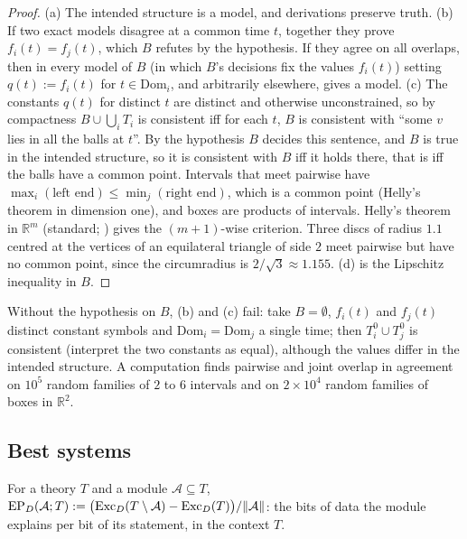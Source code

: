 \begin{proof}
(a) The intended structure is a model, and derivations preserve truth. (b) If two exact models disagree at a common time $t$, together they prove $f_i(t)=f_j(t)$, which $B$ refutes by the hypothesis. If they agree on all overlaps, then in every model of $B$ (in which $B$'s decisions fix the values $f_i(t)$) setting $q(t):=f_i(t)$ for $t\in\mathrm{Dom}_i$, and arbitrarily elsewhere, gives a model. (c) The constants $q(t)$ for distinct $t$ are distinct and otherwise unconstrained, so by compactness $B\cup\bigcup_iT_i$ is consistent iff for each $t$, $B$ is consistent with ``some $v$ lies in all the balls at $t$''. By the hypothesis $B$ decides this sentence, and $B$ is true in the intended structure, so it is consistent with $B$ iff it holds there, that is iff the balls have a common point. Intervals that meet pairwise have $\max_i(\text{left end})\le\min_j(\text{right end})$, which is a common point (Helly's theorem in dimension one), and boxes are products of intervals. Helly's theorem in $\mathbb R^m$ (standard; \citealp{helly1923mengen}) gives the $(m+1)$-wise criterion. Three discs of radius $1.1$ centred at the vertices of an equilateral triangle of side $2$ meet pairwise but have no common point, since the circumradius is $2/\sqrt3\approx1.155$. (d) is the Lipschitz inequality in $B$.
\end{proof}

Without the hypothesis on $B$, (b) and (c) fail: take $B=\emptyset$, $f_i(t)$ and $f_j(t)$ distinct constant symbols and $\mathrm{Dom}_i=\mathrm{Dom}_j$ a single time; then $T^0_i\cup T^0_j$ is consistent (interpret the two constants as equal), although the values differ in the intended structure. A computation finds pairwise and joint overlap in agreement on $10^5$ random families of $2$ to $6$ intervals and on $2\times10^4$ random families of boxes in $\mathbb R^2$.

\subsection{Best systems}\label{app:laws:best}

\begin{definition}\label{def:laws:EP}
For a theory $T$ and a module $\mathcal A\subseteq T$, $\mathrm{EP}_D(\mathcal A;T):=\big(\mathrm{Exc}_D(T\setminus\mathcal A)-\mathrm{Exc}_D(T)\big)/\lVert\mathcal A\rVert$: the bits of data the module explains per bit of its statement, in the context $T$.
\end{definition}

